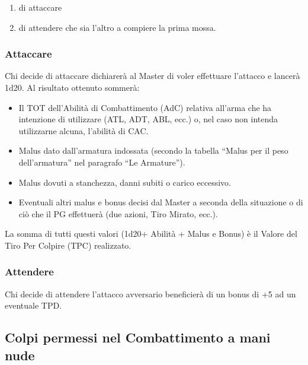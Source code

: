 \begin{enumerate}
  \itemsep 6pt
\item di attaccare
\item di attendere che sia l'altro a
  compiere la prima mossa. 
\end{enumerate}

\subsubsection{Attaccare}
Chi decide di attaccare dichiarer\`a al Master di voler effettuare
l'attacco e lancer\`a 1d20.  Al risultato ottenuto sommer\`a:

\begin{itemize}
\item Il TOT dell'Abilit\`a di Combattimento (AdC) relativa all'arma
  che ha intenzione di utilizzare (ATL, ADT, ABL, ecc.) o, nel caso
  non intenda utilizzarne alcuna, l'abilit\`a di CAC.

\item Malus dato dall'armatura indossata (secondo la tabella ``Malus per il
peso dell'armatura'' nel paragrafo ``Le Armature'').

\item Malus dovuti a stanchezza, danni subiti o carico eccessivo.

\item Eventuali altri malus e bonus decisi dal Master a seconda della
situazione o di ci\`o che il PG effettuer\`a (due azioni, Tiro
Mirato, ecc.).
\end{itemize}

La somma di tutti questi valori (1d20+ Abilit\`a + Malus e Bonus)
\`e il Valore del Tiro Per Colpire (TPC) realizzato.



\subsubsection{Attendere}

Chi decide di attendere l'attacco avversario
beneficier\`a di un bonus di +5 ad un eventuale TPD.

\subsection{Colpi
  permessi nel Combattimento a mani nude} 

